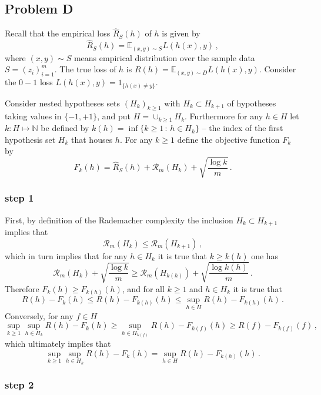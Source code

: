 \documentclass[a4paper]{article}
\newcommand{\ex}{\mathbb{E}}
\begin{document}

\subsection{Problem D} %
\label{sub:problem_1d}
Recall that the empirical loss $\hat{R}_S(h)$ of $h$ is given by
\[ \hat{R}_S(h) = \ex_{(x,y)\sim S} L(h(x), y) \,, \]
where $(x,y)\sim S$ means empirical distribution over the sample data $S=(z_i)_{i=1}^m$.
The true loss of $h$ is $R(h) = \ex_{(x,y)\sim D} L(h(x), y)$. Consider the $0-1$
loss $L(h(x), y) = 1_{\{h(x)\neq y\}}$.

Consider nested hypotheses sets $(H_k)_{k\geq1}$ with $H_k\subset H_{k+1}$ of hypotheses
taking values in $\{-1,+1\}$, and put $H=\cup_{k\geq1} H_k$. Furthermore for any
$h\in H$ let $k: H\mapsto\mathbb{N}$ be defined by $k(h) = \inf\{k\geq1\,:\, h\in H_k\}$
-- the index of the first hypothesis set $H_k$ that houses $h$. For any $k\geq1$
define the objective function $F_k$ by
\[ F_k(h) = \hat{R}_S(h) + \mathcal{R}_m(H_k) + \sqrt{\frac{\log k}{m}} \,. \]

\subsubsection*{step 1} %
\label{ssub:step_1d1}

First, by definition of the Rademacher complexity the inclusion $H_k\subset H_{k+1}$
implies that
\[ \mathcal{R}_m(H_k) \leq \mathcal{R}_m(H_{k+1}) \,, \]
which in turn implies that for any $h\in H_k$ it is true that $k\geq k(h)$ one has
\[ \mathcal{R}_m(H_k) + \sqrt{\frac{\log k}{m}}
  \geq \mathcal{R}_m(H_{k(h)}) + \sqrt{\frac{\log {k(h)}}{m}} \,. \]
Therefore $F_k(h) \geq F_{k(h)}(h)$, and for all $k\geq1$ and $h\in H_k$ it is true
that
\[ R(h) - F_k(h) \leq R(h) - F_{k(h)}(h) \leq \sup_{h\in H} R(h) - F_{k(h)}(h) \,. \]
Conversely, for any $f\in H$
\[ \sup_{k\geq1} \sup_{h\in H_k} R(h) - F_k(h)
    \geq \sup_{h\in H_{k(f)}} R(h) - F_{k(f)}(h)
    \geq R(f) - F_{k(f)}(f)
  \,, \]
which ultimately implies that
\[ \sup_{k\geq1}\sup_{h\in H_k} R(h) - F_k(h)
    = \sup_{h\in H} R(h) - F_{k(h)}(h)
  \,. \]


\subsubsection*{step 2} %
\label{ssub:step_1d2}
\end{document}

